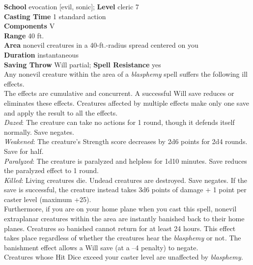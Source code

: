\textbf{School }evocation [evil, sonic]; \textbf{Level }cleric 7\\
\textbf{Casting Time} 1 standard action\\
\textbf{Components} V\\
\textbf{Range }40 ft.\\
\textbf{Area }nonevil creatures in a 40-ft.-radius spread centered on you\\
\textbf{Duration }instantaneous\\
\textbf{Saving Throw} Will partial; \textbf{Spell Resistance} yes\\
Any nonevil creature within the area of a \textit{blasphemy }spell suffers the following ill effects.\\
The effects are cumulative and concurrent. A successful Will save reduces or eliminates these effects. Creatures affected by multiple effects make only one save and apply the result to all the effects.\\
\textit{Dazed}: The creature can take no actions for 1 round, though it defends itself normally. Save negates.\\
\textit{Weakened}: The creature's Strength score decreases by 2d6 points for 2d4 rounds. Save for half.\\
\textit{Paralyzed}: The creature is paralyzed and helpless for 1d10 minutes. Save reduces the paralyzed effect to 1 round.\\
\textit{Killed}: Living creatures die. Undead creatures are destroyed. Save negates. If the save is successful, the creature instead takes 3d6 points of damage + 1 point per caster level (maximum +25).\\
Furthermore, if you are on your home plane when you cast this spell, nonevil extraplanar creatures within the area are instantly banished back to their home planes. Creatures so banished cannot return for at least 24 hours. This effect takes place regardless of whether the creatures hear the \textit{blasphemy} or not\textit{. }The banishment effect allows a Will save (at a --4 penalty) to negate.\\
Creatures whose Hit Dice exceed your caster level are unaffected by \textit{blasphemy.}\\
